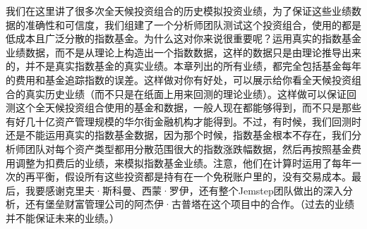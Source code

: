 我们在这里讲了很多次全天候投资组合的历史模拟投资业绩，为了保证这些业绩数据的准确性和可信度，我们组建了一个分析师团队测试这个投资组合，使用的都是低成本且广泛分散的指数基金。为什么这对你来说很重要呢？运用真实的指数基金业绩数据，而不是从理论上构造出一个指数数据，这样的数据只是由理论推导出来的，并不是真实指数基金的真实业绩。本章列出的所有业绩，都完全包括基金每年的费用和基金追踪指数的误差。这样做对你有好处，可以展示给你看全天候投资组合的真实历史业绩（而不只是在纸面上用来回测的理论业绩）。这样做可以保证回测这个全天候投资组合使用的基金和数据，一般人现在都能够得到，而不只是那些有好几十亿资产管理规模的华尔街金融机构才能得到。不过，有时候，我们回测时还是不能运用真实的指数基金数据，因为那个时候，指数基金根本不存在，我们分析师团队对每个资产类型都用分散范围很大的指数涨跌幅数据，然后再按照基金费用调整为扣费后的业绩，来模拟指数基金业绩。注意，他们在计算时运用了每年一次的再平衡，假设所有这些投资都是持有在一个免税账户里的，没有交易成本。最后，我要感谢克里夫·斯科曼、西蒙·罗伊，还有整个Jemstep团队做出的深入分析，还有堡垒财富管理公司的阿杰伊·古普塔在这个项目中的合作。（过去的业绩并不能保证未来的业绩。）
